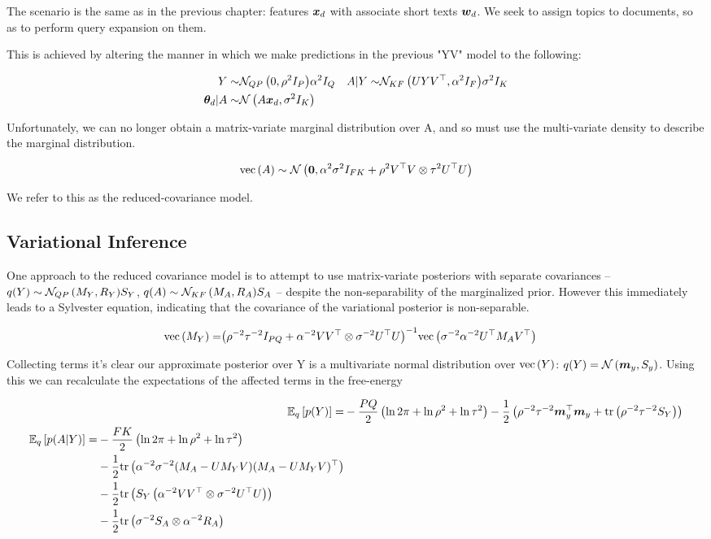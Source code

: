 The scenario is the same as in the previous chapter: features $\bm x_d$ with associate short texts ${ \bm w_d }$. We seek to assign topics to documents, so as to perform query expansion on them.

This is achieved by altering the manner in which we make predictions in the previous "YV" model to the following:

\begin{align}
Y \sim & { \mathcal{N}_{QP}\left({0},{\rho^2 I_P}\right) }{\alpha^2 I_Q} & A|Y \sim & { \mathcal{N}_{KF}\left({UYV^\top},{\alpha^2 I_F}\right) }{\sigma^2 I_K} \\
{ \bm \theta_d } | A \sim & \mathcal{N} \left( {A\bm x_d}, {\sigma^2 I_K} \right)
\end{align}

Unfortunately, we can no longer obtain a matrix-variate marginal distribution over A, and so must use the multi-variate density to describe the marginal distribution.  

\begin{align}
\text{vec}\left(A\right) \sim \mathcal{N} \left( {\bm 0}, {\alpha^2 \sigma^2 I_{FK} + \rho^2 V^\top V \otimes \tau^2 U^\top U} \right)
\end{align}

We refer to this as the reduced-covariance model.

\subsection{Variational Inference}
One approach to the reduced covariance model is to attempt to use matrix-variate posteriors with separate covariances -- $q(Y) \sim { \mathcal{N}_{QP}\left({M_Y},{R_Y}\right) }{S_Y}$, $q(A) \sim { \mathcal{N}_{KF}\left({M_A},{R_A}\right) }{S_A}$ --  despite the non-separability of the marginalized prior. However this immediately leads to a Sylvester equation, indicating that the covariance of the variational posterior is non-separable.

\begin{align}
\text{vec}\left(M_Y\right) = & {\left( \rho^{-2}\tau^{-2} I_{PQ} + \alpha^{-2}V V^\top \otimes \sigma^{-2} U ^\top U \right)}^{-1}\text{vec}\left(\sigma^{-2}\alpha^{-2} U^\top M_A V^\top\right)
\end{align}

Collecting terms it's clear our approximate posterior over Y is a multivariate normal distribution over $\text{vec}\left(Y\right)$: $q(Y) = \mathcal{N} \left( {\bm m_y}, {S_y} \right)$. Using this we can recalculate the expectations of the affected terms in the free-energy

\begin{align}
\ex{p(Y)}{q} = & -\halve{PQ}\left(\ln 2\pi + \ln \rho^2 + \ln \tau^2\right) - \half \left(\rho^{-2}\tau^{-2} \vv{m}_y\T\vv{m}_y + \Tr{\rho^{-2}\tau^{-2} S_Y}\right) \\
\begin{split}
\ex{p(A|Y)}{q} = & -\halve{FK}\left(\ln 2\pi + \ln \rho^2 + \ln \tau^2\right) \\
 & -\half \Tr{\alpha^{-2}\sigma^{-2}(M_A - U M_Y V)(M_A - U M_Y V)\T} \\
 & -\half \Tr{S_Y \left(\alpha^{-2}V V\T \otimes \sigma^{-2}U \T U\right)} \\
 & -\half \Tr{\sigma^{-2}S_A\otimes \alpha^{-2}R_A}
 \label{eqn:free_enery_u_and_v}
\end{split}
\end{align}

